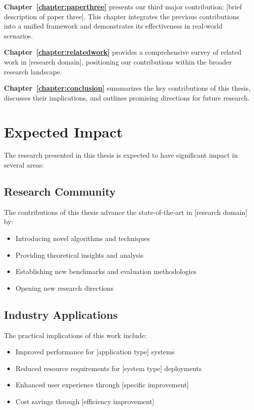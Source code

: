 \textbf{Chapter~\ref{chapter:paperthree}} presents our third major contribution: [brief description of paper three]. This chapter integrates the previous contributions into a unified framework and demonstrates its effectiveness in real-world scenarios.

\textbf{Chapter~\ref{chapter:relatedwork}} provides a comprehensive survey of related work in [research domain], positioning our contributions within the broader research landscape.

\textbf{Chapter~\ref{chapter:conclusion}} summarizes the key contributions of this thesis, discusses their implications, and outlines promising directions for future research.

\section{Expected Impact}

The research presented in this thesis is expected to have significant impact in several areas:

\subsection{Research Community}

The contributions of this thesis advance the state-of-the-art in [research domain] by:
\begin{itemize}
    \item Introducing novel algorithms and techniques
    \item Providing theoretical insights and analysis
    \item Establishing new benchmarks and evaluation methodologies
    \item Opening new research directions
\end{itemize}

\subsection{Industry Applications}

The practical implications of this work include:
\begin{itemize}
    \item Improved performance for [application type] systems
    \item Reduced resource requirements for [system type] deployments
    \item Enhanced user experience through [specific improvement]
    \item Cost savings through [efficiency improvement]
\end{itemize}

